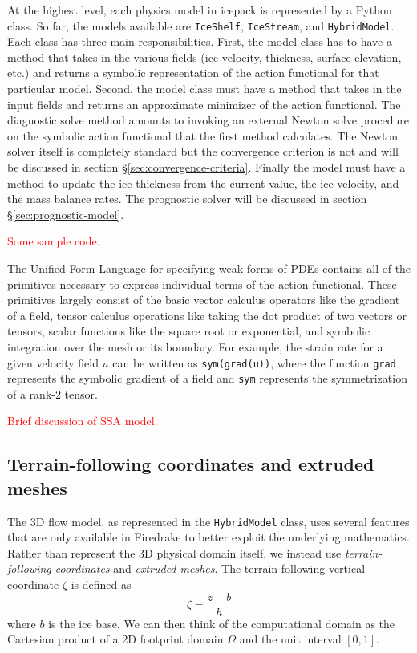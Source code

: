 \documentclass{article}
\theoremstyle{definition}
\theoremstyle{plain}
\begin{document}
At the highest level, each physics model in icepack is represented by a Python class.
So far, the models available are \texttt{IceShelf}, \texttt{IceStream}, and \texttt{HybridModel}.
Each class has three main responsibilities.
First, the model class has to have a method that takes in the various fields (ice velocity, thickness, surface elevation, etc.) and returns a symbolic representation of the action functional for that particular model.
Second, the model class must have a method that takes in the input fields and returns an approximate minimizer of the action functional.
The diagnostic solve method amounts to invoking an external Newton solve procedure on the symbolic action functional that the first method calculates.
The Newton solver itself is completely standard but the convergence criterion is not and will be discussed in section \S\ref{sec:convergence-criteria}.
Finally the model must have a method to update the ice thickness from the current value, the ice velocity, and the mass balance rates.
The prognostic solver will be discussed in section \S\ref{sec:prognostic-model}.

\textcolor{red}{Some sample code.}

The Unified Form Language for specifying weak forms of PDEs contains all of the primitives necessary to express individual terms of the action functional.
These primitives largely consist of the basic vector calculus operators like the gradient of a field, tensor calculus operations like taking the dot product of two vectors or tensors, scalar functions like the square root or exponential, and symbolic integration over the mesh or its boundary.
For example, the strain rate for a given velocity field $u$ can be written as \texttt{sym(grad(u))}, where the function \texttt{grad} represents the symbolic gradient of a field and \texttt{sym} represents the symmetrization of a rank-2 tensor.

\textcolor{red}{Brief discussion of SSA model.}

\subsection{Terrain-following coordinates and extruded meshes}

The 3D flow model, as represented in the \texttt{HybridModel} class, uses several features that are only available in Firedrake to better exploit the underlying mathematics.
Rather than represent the 3D physical domain itself, we instead use \emph{terrain-following coordinates} and \emph{extruded meshes}.
The terrain-following vertical coordinate $\zeta$ is defined as
\begin{equation}
    \zeta = \frac{z - b}{h}
\end{equation}
where $b$ is the ice base.
We can then think of the computational domain as the Cartesian product of a 2D footprint domain $\Omega$ and the unit interval $[0, 1]$.
\end{document}
